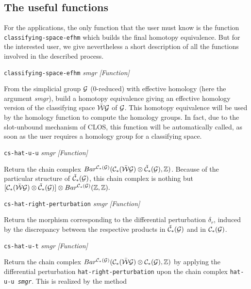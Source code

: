 \subsection {The useful functions}

For the applications, the only function that the user must know is the function {\tt classifying-space-efhm}
which builds the final homotopy equivalence. But for the
interested user, we give nevertheless a short description of all the functions
involved in the described process.

\vskip 0.30cm
{\parindent=0mm
{\leftskip=5mm
{\tt classifying-space-efhm} {\em smgr}  \hfill {\em [Function]} \par}
{\leftskip=15mm
From the simplicial group ${\cal G}$ ($0$-reduced) with effective homology (here the argument {\em smgr}), build
a homotopy equivalence giving an effective homology version  of the classifying space $\bar{\cal W}{\cal G}$ of ${\cal G}$.
This homotopy
equivalence will be used by the homology function to compute the homology groups. In fact, due to
the slot-unbound mechanism of CLOS, this function will be automatically called, as soon
as the user requires a homology group for a classifying space. \par}
{\leftskip=5mm
{\tt cs-hat-u-u} {\em smgr}  \hfill {\em [Function]} \par}
{\leftskip=15mm
Return the chain complex
$Bar^{{\cal C}_*({\cal G})}({\cal C}_*(\bar{\cal W}{\cal G})\otimes {\check{\cal C}}_*({\cal G}),\mathbb{Z})$. Because of
the particular structure of ${\check{\cal C}}_*({\cal G})$, this chain complex is nothing but
$[{\cal C}_*(\bar{\cal W}{\cal G})\otimes {\check{\cal C}}_*({\cal G})]\otimes Bar^{{\cal C}_*({\cal G})}(\mathbb{Z},\mathbb{Z}).$
\par}
{\leftskip=5mm
{\tt cs-hat-right-perturbation} {\em smgr}  \hfill {\em [Function]} \par}
{\leftskip=15mm
Return the morphism corresponding to the differential perturbation $\delta_r$, induced by
the discrepancy between the respective products in  ${\check{\cal C}}_*({\cal G})$ and
in ${\cal C}_*({\cal G})$. \par}
{\leftskip=5mm
{\tt cs-hat-u-t} {\em smgr}  \hfill {\em [Function]} \par}
{\leftskip=15mm
Return the chain complex
$Bar^{{\cal C}_*({\cal G})}({\cal C}_*(\bar{\cal W}{\cal G})\otimes {\cal C}_*({\cal G}),\mathbb{Z})$ by applying
the differential perturbation {\tt hat-right-perturbation} upon
the chain complex {\tt hat-u-u {\em smgr}}. This is realized by the method
}}
